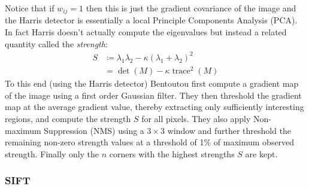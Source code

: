 Notice that if \(w_{ij} = 1\) then this is just the gradient covariance of the image and the Harris detector is essentially a local Principle Components Analysis (PCA).
%
In fact Harris doesn't actually compute the eigenvalues but instead a related quantity called the \textit{strength}:
\begin{align}
	S & \coloneqq \lambda_1 \lambda_2 - \kappa (\lambda_1 + \lambda_2)^2 \\
	  & = \det(M) - \kappa \operatorname{trace}^2(M)
	\label{eqn:strength}
\end{align}
%
To this end (using the Harris detector) Bentoutou \etal first compute a gradient map of the image using a first order Gaussian filter.
%
They then threshold the gradient map at the average gradient value, thereby extracting only sufficiently interesting regions, and compute the strength \(S\) for all pixels.
%
They also apply Non-maximum Suppression (NMS) using a \(3 \times 3\) window and further threshold the remaining non-zero strength values at a threshold of 1\% of maximum observed strength.
%
Finally only the \(n\) corners with the highest strengths \(S\) are kept.

\subsubsection{SIFT}\label{sec:sift}

